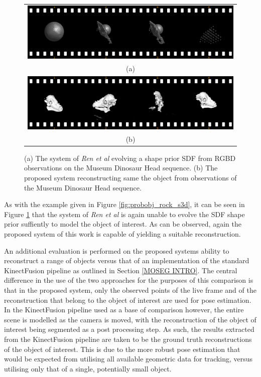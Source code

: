 \begin{figure}[h]
  \label{fig:probobj_dino_s3d}
  \centering
  \begin{tabular}{@{}c@{}}
    \includegraphics[width=.6\linewidth]{figures/object_recon/strips/dino_s3d.png} \\
    (a) \\
    \includegraphics[width=.6\linewidth]{figures/object_recon/strips/dino.png} \\ 
    (b) \\
  \end{tabular}
  \caption[Probabilistic Object Reconstruction Qualitative Results II]
  {(a) The system of \textit{Ren et al} \cite{Ren2013} evolving a shape prior SDF 
  from RGBD observations on the Museum Dinosaur Head sequence. (b) The proposed system 
  reconstructing same the object from observations of the Museum Dinosaur Head sequence.}
\end{figure}

As with the example given in Figure \ref{fig:probobj_rock_s3d}, it can be seen in 
Figure \ref{fig:probobj_dino_s3d} that the system of \textit{Ren et al} is again 
unable to evolve the SDF shape prior suffiently to model the object of interest. As 
can be observed, again the proposed system of this work is capable of yielding a suitable 
reconstruction.

An additional evaluation is performed on the proposed systems ability to reconstruct 
a range of objects versus that of an implementation of the standard KinectFusion 
pipeline as outlined in Section \ref{MOSEG INTRO}. The central difference in the use 
of the two approaches for the purposes of this comparison is that in the proposed system, 
only the observed points of the live frame and of the reconstruction that belong to the 
object of interest are used for pose estimation. In the KinectFusion pipeline used 
as a base of comparison however, the entire scene is modelled as the camera is moved, 
with the reconstruction of the object of interest being segmented as a post processing 
step. As such, the results extracted from the KinectFusion pipeline are taken to be the 
ground truth reconstructions of the object of interest. This is due to the more robust 
pose estimation that would be expected from utilising all available geometric data 
for tracking, versus utilising only that of a single, potentially small object.

